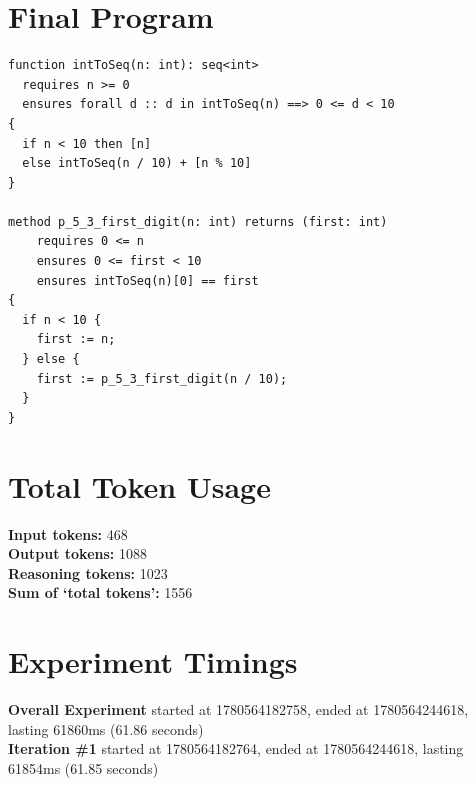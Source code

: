 \documentclass{article}
\begin{document}
\section*{Final Program}
\begin{lstlisting}
function intToSeq(n: int): seq<int>
  requires n >= 0
  ensures forall d :: d in intToSeq(n) ==> 0 <= d < 10
{
  if n < 10 then [n]
  else intToSeq(n / 10) + [n % 10]
}

method p_5_3_first_digit(n: int) returns (first: int)
	requires 0 <= n
	ensures 0 <= first < 10
	ensures intToSeq(n)[0] == first
{
  if n < 10 {
    first := n;
  } else {
    first := p_5_3_first_digit(n / 10);
  }
}
\end{lstlisting}
\section*{Total Token Usage}
\textbf{Input tokens: }468
\\\textbf{Output tokens: }1088
\\\textbf{Reasoning tokens: }1023
\\\textbf{Sum of `total tokens': }1556
\section*{Experiment Timings}
\textbf{Overall Experiment} started at 1780564182758, ended at 1780564244618, lasting 61860ms (61.86 seconds)
\\\textbf{Iteration \#1} started at 1780564182764, ended at 1780564244618, lasting 61854ms (61.85 seconds)
\end{document}
